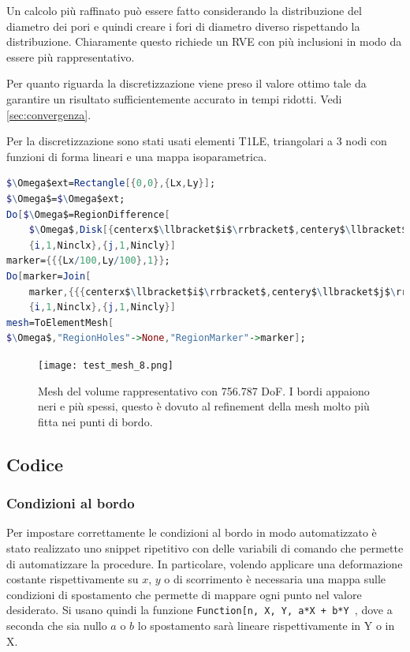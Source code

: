 \documentclass[a4paper,num-refs]{oup-contemporary}
\begin{document}
Un calcolo più raffinato può essere fatto considerando la distribuzione del diametro dei pori \citep{Doktor:2011} e quindi creare i fori di diametro diverso rispettando la distribuzione. Chiaramente questo richiede un RVE con più inclusioni in modo da essere più rappresentativo. 

Per quanto riguarda la discretizzazione viene preso il valore ottimo tale da garantire un risultato sufficientemente accurato in tempi ridotti. Vedi \cref{sec:convergenza}.

Per la discretizzazione sono stati usati elementi T1LE, triangolari a 3 nodi con funzioni di forma lineari e una mappa isoparametrica.  

\begin{lstlisting}[language=Mathematica,caption=Generazione RVE,label=code_rve]
$\Omega$ext=Rectangle[{0,0},{Lx,Ly}];
$\Omega$=$\Omega$ext;
Do[$\Omega$=RegionDifference[
	$\Omega$,Disk[{centerx$\llbracket$i$\rrbracket$,centery$\llbracket$j$\rrbracket$},{Rc,Rc}]],
	{i,1,Ninclx},{j,1,Nincly}]
marker={{{Lx/100,Ly/100},1}};
Do[marker=Join[
	marker,{{{centerx$\llbracket$i$\rrbracket$,centery$\llbracket$j$\rrbracket$},2}}],
	{i,1,Ninclx},{j,1,Nincly}]
mesh=ToElementMesh[
$\Omega$,"RegionHoles"->None,"RegionMarker"->marker];	

\end{lstlisting}


\begin{figure}[bt!] %
	\centering
	\texttt{[image: test\_mesh\_8.png]}
	\caption{Mesh del volume rappresentativo con 756.787 DoF. I bordi appaiono neri e più spessi, questo è dovuto al refinement della mesh molto più fitta nei punti di bordo.}\label{fig:Mesh}
\end{figure}



\subsection{Codice}

\subsubsection{Condizioni al bordo}

Per impostare correttamente le condizioni al bordo in modo automatizzato è stato realizzato uno snippet ripetitivo con delle variabili di comando che permette di automatizzare la procedure. In particolare, volendo applicare una deformazione costante rispettivamente su $x$, $y$ o  di scorrimento è necessaria una mappa sulle condizioni di spostamento che permette di mappare ogni punto  nel valore desiderato. Si usano quindi la funzione \texttt{Function[{n, X, Y}, a*X + b*Y }, dove a seconda che sia nullo $a$ o $b$ lo spostamento sarà lineare rispettivamente in Y o in X. 
\end{document}
